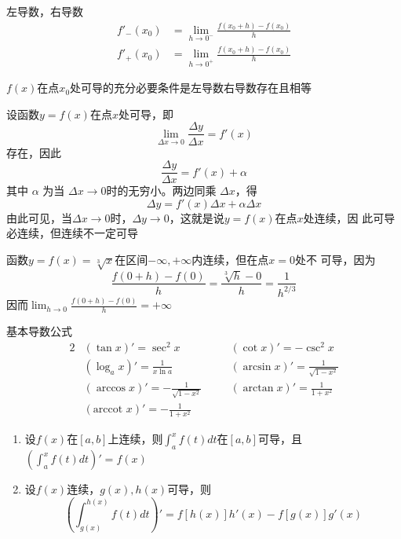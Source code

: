 \documentclass[11pt]{article}
\begin{document}
左导数，右导数
\begin{align*}
f'_-(x_0)&=\lim_{h\to0^-}\frac{f(x_0+h)-f(x_0)}{h}\\
f'_+(x_0)&=\lim_{h\to0^+}\frac{f(x_0+h)-f(x_0)}{h}
\end{align*}

\(f(x)\)在点\(x_0\)处可导的充分必要条件是左导数右导数存在且相等

设函数\(y=f(x)\)在点\(x\)处可导，即
\begin{equation*}
\lim_{\Delta x\to0}\frac{\Delta y}{\Delta x}=f'(x)
\end{equation*}
存在，因此
\begin{equation*}
\frac{\Delta y}{\Delta x}=f'(x)+\alpha
\end{equation*}
其中 \(\alpha\) 为当 \(\Delta x\to0\)时的无穷小。两边同乘 \(\Delta x\)，得
\begin{equation*}
\Delta y=f'(x)\Delta x+\alpha \Delta x
\end{equation*}
由此可见，当\(\Delta x\to0\)时，\(\Delta y\to0\)，这就是说\(y=f(x)\)在点\(x\)处连续，因
此可导必连续，但连续不一定可导

\begin{examplle}[]
函数\(y=f(x)=\sqrt[3]{x}\)在区间\(-\infty,+\infty\)内连续，但在点\(x=0\)处不
可导，因为
\begin{equation*}
\frac{f(0+h)-f(0)}{h}=\frac{\sqrt[3]{h}-0}{h}=\frac{1}{h^{2/3}}
\end{equation*}
因而\(\lim_{h\to0}\frac{f(0+h)-f(0)}{h}=+\infty\)
\end{examplle}

基本导数公式
\begin{alignat*}{2}
&(\tan x)'=\sec^2x&&(\cot x)'=-\csc^2x\\
&(\log_ax)'=\frac{1}{x\ln a}&&(\arcsin x)' = \frac{1}{\sqrt{1-x^2}}\\
&(\arccos x)' = -\frac{1}{\sqrt{1-x^2}}\quad&&
(\arctan x)' = \frac{1}{1+x^2}\\
&(\text{arccot } x)' = -\frac{1}{1+x^2}&&
\end{alignat*}

\begin{enumerate}
\item 设\(f(x)\)在\([a,b]\)上连续，则\(\int_a^xf(t)dt\)在\([a,b]\)可导，且
\(\displaystyle\left(\int_a^xf(t)dt\right)'=f(x)\)
\item 设\(f(x)\)连续，\(g(x),h(x)\)可导，则
\begin{equation*}
\left(\int_{g(x)}^{h(x)}f(t)dt
\right)'=f[h(x)]h'(x)-f[g(x)]g'(x)
\end{equation*}
\end{enumerate}
\end{document}
